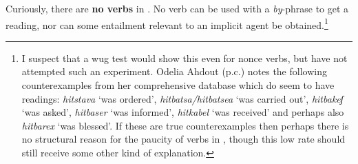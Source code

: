 \begin{exe}
\begin{xlist}
\begin{xlist}
\begin{exe}
\begin{xlist}
\begin{xlist}
\begin{exe}
\begin{xlist}
\begin{xlist}
\begin{exe}
\begin{exe}
\begin{xlist}
\begin{exe}
\begin{exe}
\begin{xlist}
\begin{exe}
\begin{exe}
\begin{exe}
\begin{exe}
\begin{exe}
\begin{xlist}
\begin{exe}
\begin{xlist}
\begin{exe}
\begin{exe}
\begin{xlist}
\begin{exe}
\begin{xlist}
\begin{exe}
\begin{xlist}
\begin{exe}
\begin{exe}
\begin{exe}
\begin{xlist}
\begin{exe}
\begin{exe}
\begin{exe}
\begin{xlist}
\begin{exe}
\begin{xlist}
\begin{exe}
\begin{xlist}
\begin{exe}
\begin{xlist}
\begin{exe}
\begin{exe}
\begin{exe}
\begin{exe}
\begin{xlist}
\begin{exe}
\begin{xlist}
\begin{exe}
\begin{xlist}
\begin{exe}
\begin{xlist}
\begin{exe}
\begin{xlist}
\begin{exe}
\begin{xlist}
\begin{exe}
\begin{exe}
\begin{exe}
\begin{exe}
\begin{xlist}
\begin{exe}
\begin{xlist}
\begin{exe}
\begin{xlist}
\begin{exe}
\begin{exe}
\begin{xlist}
\begin{exe}
\begin{xlist}
\begin{exe}
\begin{exe}
\begin{exe}
\begin{exe}
\begin{xlist}
\begin{xlist}
\begin{exe}
\begin{xlist}
\begin{exe}
Curiously, there are \textbf{no  verbs} in {\thit}. No verb can be used with a \emph{by}-phrase to get a  reading, nor can some entailment relevant to an implicit agent be obtained.\footnote{I suspect that a wug test would show this even for nonce verbs, but have not attempted such an experiment. Odelia Ahdout (p.c.) notes the following counterexamples from her comprehensive database which do seem to have  readings: \emph{hitstava} `was ordered', \emph{hitbatsa/hitbatsea} `was carried out', \emph{hitbakeʃ} `was asked', \emph{hitbaser} `was informed', \emph{hitkabel} `was received' and perhaps also \emph{hitbarex} `was blessed'. If these are true counterexamples then perhaps there is no structural reason for the paucity of  verbs in {\thit}, though this low rate should still receive some other kind of explanation.}
 \begin{exe}
	
 \z 


\end{exe}
\end{exe}
\end{xlist}
\end{exe}
\end{xlist}
\end{xlist}
\end{exe}
\end{exe}
\end{exe}
\end{exe}
\end{xlist}
\end{exe}
\end{xlist}
\end{exe}
\end{exe}
\end{xlist}
\end{exe}
\end{xlist}
\end{exe}
\end{xlist}
\end{exe}
\end{exe}
\end{exe}
\end{exe}
\end{xlist}
\end{exe}
\end{xlist}
\end{exe}
\end{xlist}
\end{exe}
\end{xlist}
\end{exe}
\end{xlist}
\end{exe}
\end{xlist}
\end{exe}
\end{exe}
\end{exe}
\end{exe}
\end{xlist}
\end{exe}
\end{xlist}
\end{exe}
\end{xlist}
\end{exe}
\end{xlist}
\end{exe}
\end{exe}
\end{exe}
\end{xlist}
\end{exe}
\end{exe}
\end{exe}
\end{xlist}
\end{exe}
\end{xlist}
\end{exe}
\end{xlist}
\end{exe}
\end{exe}
\end{xlist}
\end{exe}
\end{xlist}
\end{exe}
\end{exe}
\end{exe}
\end{exe}
\end{exe}
\end{xlist}
\end{exe}
\end{exe}
\end{xlist}
\end{exe}
\end{exe}
\end{xlist}
\end{xlist}
\end{exe}
\end{xlist}
\end{xlist}
\end{exe}
\end{xlist}
\end{xlist}
\end{exe}
